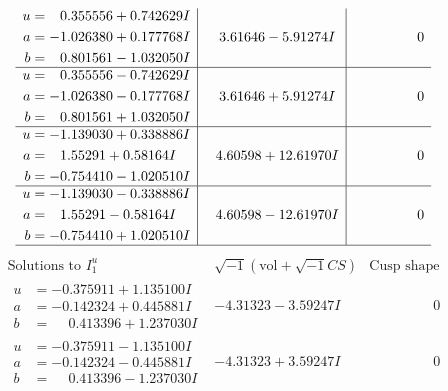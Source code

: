 \documentclass[1p]{elsarticle_modified}
\theoremstyle{definition}
\newcommand{\I}{\sqrt{-1}}
\begin{document}
$$\begin{array}{c|c|c}
\begin{aligned}
u &= \phantom{-}0.355556 + 0.742629 I \\
a &= -1.026380 + 0.177768 I \\
b &= \phantom{-}0.801561 - 1.032050 I\end{aligned}
 & \phantom{-}3.61646 - 5.91274 I & \phantom{-0.000000 } 0 \\ \hline\begin{aligned}
u &= \phantom{-}0.355556 - 0.742629 I \\
a &= -1.026380 - 0.177768 I \\
b &= \phantom{-}0.801561 + 1.032050 I\end{aligned}
 & \phantom{-}3.61646 + 5.91274 I & \phantom{-0.000000 } 0 \\ \hline\begin{aligned}
u &= -1.139030 + 0.338886 I \\
a &= \phantom{-}1.55291 + 0.58164 I \\
b &= -0.754410 - 1.020510 I\end{aligned}
 & \phantom{-}4.60598 + 12.61970 I & \phantom{-0.000000 } 0 \\ \hline\begin{aligned}
u &= -1.139030 - 0.338886 I \\
a &= \phantom{-}1.55291 - 0.58164 I \\
b &= -0.754410 + 1.020510 I\end{aligned}
 & \phantom{-}4.60598 - 12.61970 I & \phantom{-0.000000 } 0\\
 \hline 
 \end{array}$$\newpage$$\begin{array}{c|c|c}  
\text{Solutions to }I^u_{1}& \I (\text{vol} + \sqrt{-1}CS) & \text{Cusp shape}\\
 \hline 
\begin{aligned}
u &= -0.375911 + 1.135100 I \\
a &= -0.142324 + 0.445881 I \\
b &= \phantom{-}0.413396 + 1.237030 I\end{aligned}
 & -4.31323 - 3.59247 I & \phantom{-0.000000 } 0 \\ \hline\begin{aligned}
u &= -0.375911 - 1.135100 I \\
a &= -0.142324 - 0.445881 I \\
b &= \phantom{-}0.413396 - 1.237030 I\end{aligned}
 & -4.31323 + 3.59247 I & \phantom{-0.000000 } 0 \\ \hline\begin{aligned}

\end{aligned}
\end{array}$$
\end{document}
